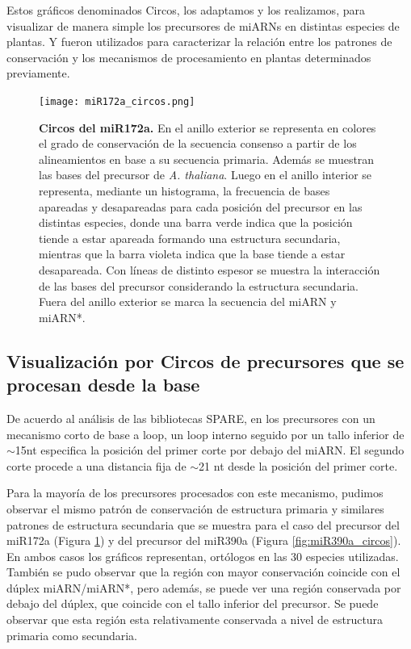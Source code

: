Estos gráficos denominados Circos, los adaptamos y los realizamos, para visualizar de manera simple los precursores de miARNs en distintas especies de plantas.
Y fueron utilizados para caracterizar la relación entre los patrones de conservación y los mecanismos de procesamiento en plantas determinados previamente.


\begin{figure}[htbp!] 
    \centering    
    \texttt{[image: miR172a\_circos.png]}
    \caption[Circos del miR172a]{
    \textbf{Circos del miR172a.}
En el anillo exterior se representa en colores el grado de conservación de la secuencia consenso a partir de los alineamientos en base a su secuencia primaria.
Además se muestran las bases del precursor de \textit {A. thaliana}.
Luego en el anillo interior se representa, mediante un histograma, la frecuencia de bases apareadas y desapareadas para cada posición del precursor en las distintas especies, donde una barra verde indica que la posición tiende a estar apareada formando una estructura secundaria, mientras que la barra violeta indica que la base tiende a estar desapareada. 
Con líneas de distinto espesor se muestra la interacción de las bases del precursor considerando la estructura secundaria. 
Fuera del anillo exterior se marca la secuencia del miARN y miARN*.
   }
     \label{fig:miR172a_circos}
\end{figure}


\subsection{Visualización por Circos de precursores que se procesan desde la base}

De acuerdo al análisis de las bibliotecas SPARE, en los precursores con un mecanismo corto de base a loop, un loop interno seguido por un tallo inferior de $\sim$15nt especifica la posición del primer corte por debajo del miARN.
El segundo corte procede a una distancia fija de $\sim$21 nt desde la posición del primer corte.

Para la mayoría de los precursores procesados con este mecanismo, pudimos observar el mismo patrón de conservación de estructura primaria y similares patrones de estructura secundaria que se muestra para el caso del precursor del miR172a (Figura \ref{fig:miR172a_circos}) y del precursor del miR390a (Figura \ref{fig:miR390a_circos}).
En ambos casos los gráficos representan, ortólogos en las 30 especies utilizadas.
También se pudo observar que la región con mayor conservación coincide con el dúplex miARN/miARN*, pero además, se puede ver una región conservada por debajo del dúplex, que coincide con el tallo inferior del precursor.
Se puede observar que esta región esta relativamente conservada a nivel de estructura primaria como secundaria.

